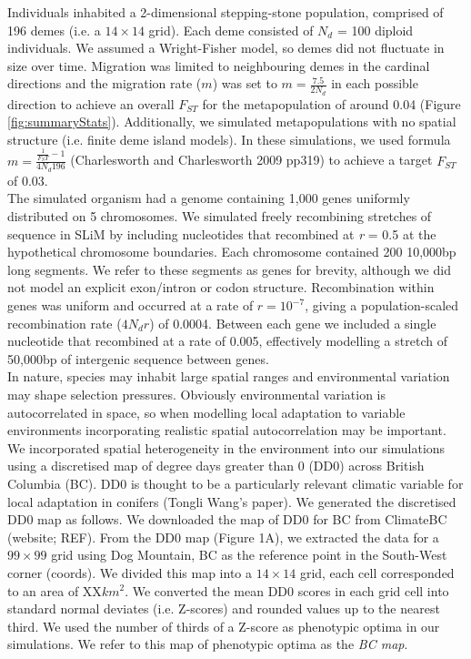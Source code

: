 \documentclass[11pt,twoside,lineno]{GSA_format}
\begin{document}
Individuals inhabited a 2-dimensional stepping-stone population, comprised of 196 demes (i.e. a $14\times14$ grid). Each deme consisted of $N_d$ = 100 diploid individuals. We assumed a Wright-Fisher model, so demes did not fluctuate in size over time. Migration was limited to neighbouring demes in the cardinal directions and the migration rate ($m$) was set to $m = \frac{7.5}{2N_d}$ in each possible direction to achieve an overall $F_{ST}$ for the metapopulation of around 0.04 (Figure \ref{fig:summaryStats}). Additionally, we simulated metapopulations with no spatial structure (i.e. finite deme island models). In these simulations, we used formula $m = \frac{\frac{1}{F_ST} - 1}{4N_d196}$ (Charlesworth and Charlesworth 2009 pp319) to achieve a target $F_{ST}$ of 0.03.\\

The simulated organism had a genome containing 1,000 genes uniformly distributed on 5 chromosomes. We simulated freely recombining stretches of sequence in SLiM by including nucleotides that recombined at \textit{r} = 0.5 at the hypothetical chromosome boundaries. Each chromosome contained 200 10,000bp long segments. We refer to these segments as genes for brevity, although we did not model an explicit exon/intron or codon structure. Recombination within genes was uniform and occurred at a rate of $r = 10^{-7}$, giving a population-scaled recombination rate ($4N_dr$) of 0.0004. Between each gene we included a single nucleotide that recombined at a rate of 0.005, effectively modelling a stretch of 50,000bp of intergenic sequence between genes. \\

In nature, species may inhabit large spatial ranges and environmental variation may shape selection pressures. Obviously environmental variation is autocorrelated in space, so when modelling local adaptation to variable environments incorporating realistic spatial autocorrelation may be important. \\

We incorporated spatial heterogeneity in the environment into our simulations using a discretised map of degree days greater than 0 (DD0) across British Columbia (BC). DD0 is thought to be a particularly relevant climatic variable for local adaptation in conifers (Tongli Wang's paper). We generated the discretised DD0 map as follows. We downloaded the map of DD0 for BC from ClimateBC (website; REF). From the DD0 map (Figure 1A), we extracted the data for a $99\times99$ grid using Dog Mountain, BC as the reference point in the South-West corner (coords). We divided this map into a $14\times14$ grid, each cell corresponded to an area of XX$km^2$.  We converted the mean DD0 scores in each grid cell into standard normal deviates (i.e. Z-scores) and rounded values up to the nearest third. We used the number of thirds of a Z-score as phenotypic optima in our simulations. We refer to this map of phenotypic optima as the \textit{BC map}.\\
\end{document}
